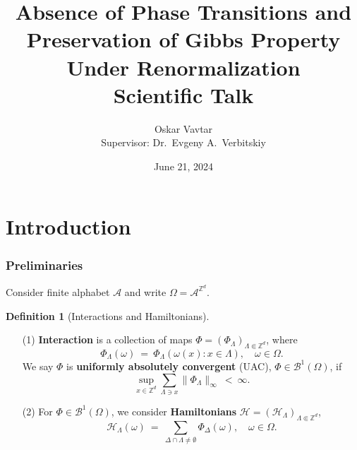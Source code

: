 \documentclass{beamer}
\newcommand{\A}{\mathcal{A}}
\newcommand{\BB}{\mathscr{B}}
\renewcommand{\H}{\mathcal{H}}
\newcommand{\Z}{\mathbb{Z}}
\newcommand{\1}{\mathbbm{1}}
\newcommand{\5}{\vspace{0.5cm}}
\newcommand{\3}{\vspace{0.3cm}}
\theoremstyle{definition}
\newtheorem{df}[thm]{Definition}
\begin{document}

\title[Scientific Talk]{Absence of Phase Transitions and Preservation of Gibbs Property Under Renormalization \\\vspace{0.4cm} \small{Scientific Talk}}
\author[Oskar Vavtar]{Oskar Vavtar \\\vspace{0.2cm} \small{Supervisor: Dr.~Evgeny A.~Verbitskiy}}
\date{June 21, 2024}

\begin{frame}
	\titlepage
\end{frame}

\begin{frame}
	\tableofcontents
\end{frame}


\section{Introduction}


\begin{frame}
\frametitle{Preliminaries}
Consider finite alphabet $\A$ and write $\Omega=\A^{\Z^d}$.\pause
\begin{df}[Interactions and Hamiltonians]
\begin{itemize}
	\item[(1)] \textbf{Interaction} is a collection of maps $\Phi=(\Phi_\Lambda)_{\Lambda\Subset\Z^d}$, where
	$$\Phi_\Lambda(\omega) ~=~ \Phi_\Lambda(\omega(x):x\in\Lambda), \quad \omega\in\Omega.$$\pause
	We say $\Phi$ is \textbf{uniformly absolutely convergent} (UAC), $\Phi\in\BB^1(\Omega)$, if
	$$\sup_{x\in\Z^d}\sum_{\Lambda\ni x}\|\Phi_\Lambda\|_\infty ~<~ \infty.$$\pause
	\item[(2)] For $\Phi\in\BB^1(\Omega)$, we consider \textbf{Hamiltonians} $\H=(\H_{\Lambda})_{\Lambda\Subset\Z^d}$,
	$$\H_\Lambda(\omega) ~=~ \sum_{\Delta\cap\Lambda\neq\emptyset}\Phi_\Delta(\omega), \quad \omega\in\Omega.$$
\end{itemize}
\end{df}
\end{frame}
\end{document}
